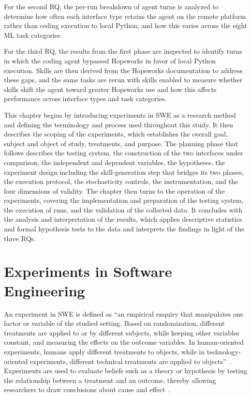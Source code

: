 \documentclass[
english,                 %
bibtex,                  %
includeExtraAbstracts, %
]{kththesis}
\numberwithin{listing}{chapter}
\begin{document}
For the second \gls{RQ}, the per-run breakdown of agent turns is analyzed to determine how often each interface type retains the agent on the remote platform rather than ceding execution to local Python, and how this varies across the eight \gls{ML} task categories.

For the third \gls{RQ}, the results from the first phase are inspected to identify turns in which the coding agent bypassed Hopsworks in favor of local Python execution. Skills are then derived from the Hopsworks documentation to address these gaps, and the same tasks are rerun with skills enabled to measure whether skills shift the agent toward greater Hopsworks use and how this affects performance across interface types and task categories.

This chapter begins by introducing experiments in \gls{SWE} as a research method and defining the terminology and process used throughout this study. It then describes the scoping of the experiments, which establishes the overall goal, subject and object of study, treatments, and purpose. The planning phase that follows describes the testing system, the construction of the two interfaces under comparison, the independent and dependent variables, the hypotheses, the experiment design including the skill-generation step that bridges its two phases, the execution protocol, the stochasticity controls, the instrumentation, and the four dimensions of validity. The chapter then turns to the operation of the experiments, covering the implementation and preparation of the testing system, the execution of runs, and the validation of the collected data. It concludes with the analysis and interpretation of the results, which applies descriptive statistics and formal hypothesis tests to the data and interprets the findings in light of the three \glspl{RQ}.

\section{Experiments in Software Engineering}

An experiment in \gls{SWE} is defined as ``an empirical enquiry that manipulates one factor or variable of the studied setting. Based on randomization, different treatments are applied to or by different subjects, while keeping other variables constant, and measuring the effects on the outcome variables. In human-oriented experiments, humans apply different treatments to objects, while in technology-oriented experiments, different technical treatments are applied to objects''~\cite{wohlin_experimentation_2024}. Experiments are used to evaluate beliefs such as a theory or hypothesis by testing the relationship between a treatment and an outcome, thereby allowing researchers to draw conclusions about cause and effect~\cite{bacon_novum_1995}.
\end{document}
